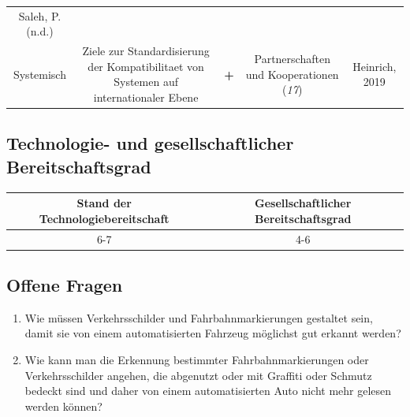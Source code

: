\documentclass[
]{book}
\providecommand{\tightlist}{%
  \setlength{\itemsep}{0pt}\setlength{\parskip}{0pt}}
\begin{document}
\begin{longtable}[]{@{}ccccc@{}}
\begin{minipage}[t]{0.17\columnwidth}
Saleh, P. (n.d.)\strut
\end{minipage}\tabularnewline
\begin{minipage}[t]{0.17\columnwidth}\centering
Systemisch\strut
\end{minipage} & \begin{minipage}[t]{0.16\columnwidth}\centering
Ziele zur Standardisierung der Kompatibilitaet von Systemen auf internationaler Ebene\strut
\end{minipage} & \begin{minipage}[t]{0.17\columnwidth}\centering
\textbf{+}\strut
\end{minipage} & \begin{minipage}[t]{0.17\columnwidth}\centering
Partnerschaften und Kooperationen (\emph{17})\strut
\end{minipage} & \begin{minipage}[t]{0.17\columnwidth}\centering
Heinrich, 2019\strut
\end{minipage}\tabularnewline
\bottomrule
\end{longtable}

\hypertarget{technologie--und-gesellschaftlicher-bereitschaftsgrad-16}{%
\subsection*{Technologie- und gesellschaftlicher Bereitschaftsgrad}\label{technologie--und-gesellschaftlicher-bereitschaftsgrad-16}}

\begin{longtable}[]{@{}cc@{}}
\toprule
Stand der Technologiebereitschaft & Gesellschaftlicher Bereitschaftsgrad\tabularnewline
\midrule
\endhead
6-7 & 4-6\tabularnewline
\bottomrule
\end{longtable}

\hypertarget{offene-fragen-19}{%
\subsection*{Offene Fragen}\label{offene-fragen-19}}

\begin{enumerate}
\def\labelenumi{\arabic{enumi}.}
\tightlist
\item
  Wie müssen Verkehrsschilder und Fahrbahnmarkierungen gestaltet sein, damit sie von einem automatisierten Fahrzeug möglichst gut erkannt werden?
\item
  Wie kann man die Erkennung bestimmter Fahrbahnmarkierungen oder Verkehrsschilder angehen, die abgenutzt oder mit Graffiti oder Schmutz bedeckt sind und daher von einem automatisierten Auto nicht mehr gelesen werden können?
\end{enumerate}
\end{document}
